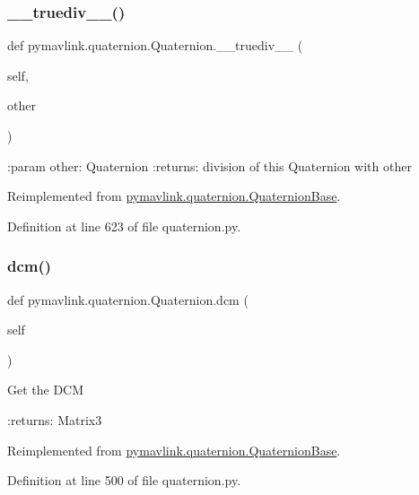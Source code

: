 \subsubsection{\texorpdfstring{\_\_truediv\_\_()}{\_\_truediv\_\_()}}
{\footnotesize\ttfamily def pymavlink.\+quaternion.\+Quaternion.\+\_\+\+\_\+truediv\+\_\+\+\_\+ (\begin{DoxyParamCaption}\item[{}]{self,  }\item[{}]{other }\end{DoxyParamCaption})}

\begin{DoxyVerb}:param other: Quaternion
:returns: division of this Quaternion with other
\end{DoxyVerb}
 

Reimplemented from \mbox{\hyperlink{classpymavlink_1_1quaternion_1_1QuaternionBase_acdb6fa13b26fc10c02eb40ee51de6899}{pymavlink.\+quaternion.\+Quaternion\+Base}}.



Definition at line 623 of file quaternion.\+py.

\mbox{\label{classpymavlink_1_1quaternion_1_1Quaternion_a8c596178af38be093dd787c609d7da09}} 
\subsubsection{\texorpdfstring{dcm()}{dcm()}\hspace{0.1cm}{\footnotesize\ttfamily [1/2]}}
{\footnotesize\ttfamily def pymavlink.\+quaternion.\+Quaternion.\+dcm (\begin{DoxyParamCaption}\item[{}]{self }\end{DoxyParamCaption})}

\begin{DoxyVerb}Get the DCM

:returns: Matrix3
\end{DoxyVerb}
 

Reimplemented from \mbox{\hyperlink{classpymavlink_1_1quaternion_1_1QuaternionBase_a534fc3e09f0c3b65e8fe5105d39e4891}{pymavlink.\+quaternion.\+Quaternion\+Base}}.



Definition at line 500 of file quaternion.\+py.

